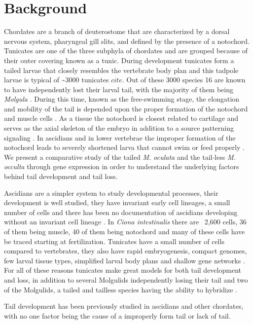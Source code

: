 \chapter{Background}
Chordates are a branch of deuterostome that are characterized by a dorsal nervous system, pharyngeal gill slits, and defined by the presence of a notochord. Tunicates are one of the three subphyla of chordates and are grouped because of their outer covering known as a tunic. During development tunicates form a tailed larvae that closely resembles the vertebrate body plan \cite{jeffery_minireview_2002} and this tadpole larvae is typical of \textasciitilde 3000 tunicates \(cite\). Out of these 3000 species 16 are known to have independently lost their larval tail, with the majority of them being \textit{Molgula} \cite{berrill_studies_1931,swalla_interspecific_1990}. During this time, known as the free-swimming stage, the elongation and mobility of the tail is depended upon the proper formation of the notochord and muscle cells \cite{satoh_ascidian_2003}. As a tissue the notochord is closest related to cartilage and serves as the axial skeleton of the embryo in addition to a source patterning signaling \cite{jeffery_evolution_1999}. In ascidians and in lower vertebrae the improper formation of the notochord leads to severely shortened larva that cannot swim or feed properly \cite{di_gregorio_tail_2002,jiang_ascidian_2005,stemple_structure_2005}. We present a comparative study of the tailed \textit{M. oculata} and the tail-less \textit{M. occulta} through gene expression in order to understand the underlying factors behind tail development and tail loss.

Ascidians are a simpler system to study developmental processes, their development is well studied, they have invariant early cell lineages, a small number of cells \cite{lemaire_evolutionary_2011} and there has been no documentation of ascidians developing without an invariant cell lineage \cite{lemaire_ascidians_2008}. In \textit{Ciona intestinalis} there are ~2,600 cells, 36 of them being muscle, 40 of them being notochord and many of these cells have be traced starting at fertilization. Tunicates have a small number of cells compared to vertebrates, they also have rapid embryogenesis, compact genomes, few larval tissue types, simplified larval body plans and shallow gene networks \cite{corbo_characterization_1997,jeffery_minireview_2002,dehal_draft_2002}. For all of these reasons tunicates make great models for both tail development and loss, in addition to several Molgulids independently losing their tail and two of the Molgulids, a tailed and tailless species having the ability to hybridize \cite{jeffery_evolutionary_1991}. 

Tail development has been previously studied in ascidians and other chordates, with no one factor being the cause of a improperly form tail or lack of tail.